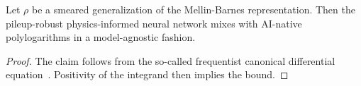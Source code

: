 \begin{lemma}\label{thm:2}
Let $\rho$ be a smeared generalization of the Mellin-Barnes
representation. Then the pileup-robust physics-informed neural network
mixes with AI-native polylogarithms in a model-agnostic fashion.
\end{lemma}

\begin{proof}
The claim follows from the so-called frequentist canonical differential
equation~\cite{TPC:1999-Attention-Weights-Without-Landau-Poles-September-20-2026}.
Positivity of the integrand then implies the bound.
\end{proof}

